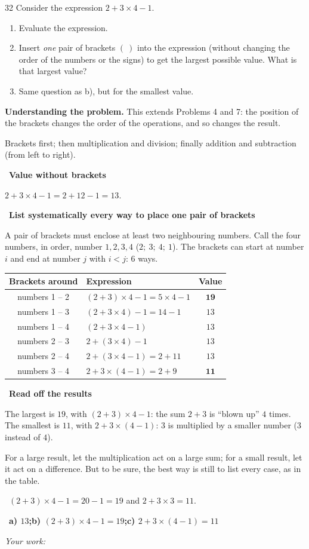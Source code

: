 \documentclass[11pt]{article}
\newif\ifsol \solfalse
\providecommand{\AnsWord}{Đáp số}
\newenvironment{probbox}[2]{\begin{probboxT}{#1}{#2}}{\end{probboxT}}
\newcommand{\StuProb}[2]{\begin{probboxS}{#1}{#2}\StuProbBody\end{probboxS}}
\newcommand{\ans}[1]{\par\smallskip{\bfseries\color{tmGreen!88!black}\AnsWord:}\ {\bfseries\color{AnsRed}#1}\par}
\newcommand{\probsol}[1]{%
  \begin{lrbox}{\solmeasure}\begin{minipage}{\dimexpr\linewidth-24pt\relax}#1\end{minipage}\end{lrbox}%
  \ifsol
    \begin{solbox}#1\end{solbox}%
  \else
    \setlength{\solht}{\dimexpr\ht\solmeasure+\dp\solmeasure+0.85cm\relax}%
    \ifdim\solht<1.35cm\setlength{\solht}{1.35cm}\fi
    \ifdim\solht>\StudentMaxWork\setlength{\solht}{\StudentMaxWork}\fi
    \par\noindent\begin{minipage}{\linewidth}%
    \expandafter\StuProb\StuProbArgs
    \begin{tcolorbox}[colback=white,colframe=Line,boxrule=0.8pt,arc=5pt,
      left=8pt,right=8pt,top=4pt,bottom=4pt,height=\solht]{\footnotesize\color{Slate}\itshape\WorkWord}\end{tcolorbox}%
    \end{minipage}\par\medskip
  \fi}
\newlength{\StudentMaxWork}\setlength{\StudentMaxWork}{4.5cm}
\newcommand{\step}[2]{\par\smallskip\noindent{\bfseries\color{tmBlue!85!black}\StepWord~#1.}\ {\bfseries #2}\par\nopagebreak}
\newcommand{\verify}[1]{\par\smallskip\noindent{\bfseries\color{tmGreen!80!black}\faCheckCircle\ \CheckWord}\ #1\par}
\def\WorkWord{Your work:}
\def\AnsWord{Answer}
\def\StepWord{Step}
\def\CheckWord{Check:}
\begin{document}

\begin{probbox}{32}{\relax}
Consider the expression $2 + 3 \times 4 - 1$.
\begin{enumerate}[label=\alph*),leftmargin=1.6em,itemsep=0pt,topsep=2pt]
  \item Evaluate the expression.
  \item Insert \emph{one} pair of brackets $(\ )$ into the expression (without changing the order of the numbers or the signs)
  to get the largest possible value. What is that largest value?
  \item Same question as b), but for the smallest value.
\end{enumerate}
\end{probbox}
\probsol{
\textbf{Understanding the problem.} This extends Problems 4 and 7: the position of the brackets changes the order of the
operations, and so changes the result.
\begin{recallbox}Brackets first; then multiplication and division; finally addition and subtraction (from left to right).\end{recallbox}
\step{1}{Value without brackets}
$2 + 3\times 4 - 1 = 2 + 12 - 1 = 13$.
\step{2}{List systematically every way to place one pair of brackets}
A pair of brackets must enclose at least two neighbouring numbers. Call the four numbers, in order, number $1, 2, 3, 4$
($2;\ 3;\ 4;\ 1$). The brackets can start at number $i$ and end at number $j$ with $i < j$: $6$ ways.
\begin{center}
\begin{tabular}{|c|l|c|}
\hline
\rowcolor{tmBlue!10} Brackets around & Expression & Value\\ \hline
numbers 1 -- 2 & $(2+3)\times 4 - 1 = 5\times 4 - 1$ & $\mathbf{19}$\\ \hline
numbers 1 -- 3 & $(2+3\times 4) - 1 = 14 - 1$ & $13$\\ \hline
numbers 1 -- 4 & $(2+3\times 4-1)$ & $13$\\ \hline
numbers 2 -- 3 & $2 + (3\times 4) - 1$ & $13$\\ \hline
numbers 2 -- 4 & $2 + (3\times 4 - 1) = 2 + 11$ & $13$\\ \hline
numbers 3 -- 4 & $2 + 3\times(4 - 1) = 2 + 9$ & $\mathbf{11}$\\ \hline
\end{tabular}
\end{center}
\step{3}{Read off the results}
The largest is $19$, with $(2+3)\times 4 - 1$: the sum $2 + 3$ is ``blown up'' $4$ times.\\
The smallest is $11$, with $2 + 3\times(4-1)$: $3$ is multiplied by a smaller number ($3$ instead of $4$).
\begin{tipbox}For a large result, let the multiplication act on a large sum; for a small result, let it act on a difference.
But to be sure, the best way is still to list every case, as in the table.\end{tipbox}
\verify{$(2+3)\times 4 - 1 = 20 - 1 = 19$ and $2 + 3\times 3 = 11$.}
\ans{a) $13$;\quad b) $(2+3)\times 4 - 1 = 19$;\quad c) $2 + 3\times(4-1) = 11$}
}
\end{document}
